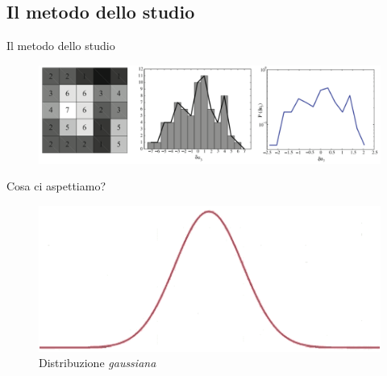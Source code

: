\documentclass[11pt]{beamer}
\begin{document}
\subsection{Il metodo dello studio}

\begin{frame}{Il metodo dello studio}
\begin{figure}
\centering
\includegraphics[scale=0.22]{studio1.png}
\end{figure}
\end{frame}


\begin{frame}{Cosa ci aspettiamo?}
\begin{figure}
\centering
\includegraphics[scale=0.6]{gauss1.png}
\caption{Distribuzione \emph{gaussiana} }
\end{figure}
\end{frame}
\end{document}
